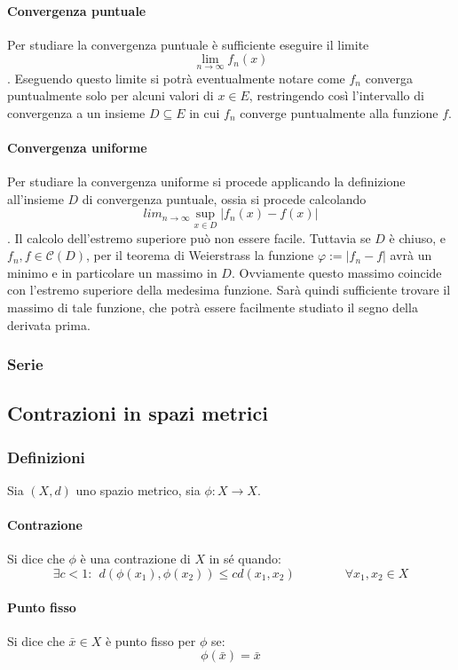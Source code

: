 \documentclass[a4paper,12pt]{article}
\newcommand{\cont}{\mathscr{C}}
\begin{document}
\paragraph*{Convergenza puntuale}
Per studiare la convergenza puntuale è sufficiente eseguire il limite
$$\lim_{n\to\infty} f_n(x)$$.
Eseguendo questo limite si potrà eventualmente notare come ${f_n}$ converga puntualmente solo per alcuni valori di $x\in E$, restringendo così l'intervallo di convergenza a un insieme $D\subseteq E$ in cui $f_n$ converge puntualmente alla funzione $f$.
\paragraph{Convergenza uniforme}
Per studiare la convergenza uniforme si procede applicando la definizione all'insieme $D$ di convergenza puntuale, ossia si procede calcolando
$$lim_{n\to\infty} \sup_{x\in D} |f_n(x)- f(x)|$$.
Il calcolo dell'estremo superiore può non essere facile. Tuttavia se $D$ è chiuso, e $f_n, f \in\cont(D)$,   per il teorema di Weierstrass la funzione $\varphi:=|f_n-f|$ avrà un minimo e in particolare un massimo in $D$. Ovviamente questo massimo coincide con l'estremo superiore della medesima funzione. Sarà quindi sufficiente trovare il massimo di tale funzione, che potrà essere facilmente studiato il segno della derivata prima.

\subsubsection{Serie}


\subsection{Contrazioni in spazi metrici}
\subsubsection{Definizioni}
Sia $(X, d)$ uno spazio metrico, sia $\phi : X\rightarrow X$.
\paragraph{Contrazione}
Si dice che $\phi$ è una contrazione di $X$ in sé quando:
$$\exists c < 1:\ \ d(\phi(x_1), \phi(x_2)) \leq cd(x_1, x_2)\qquad\qquad\forall x_1, x_2 \in X$$
\paragraph{Punto fisso}
Si dice che $\bar{x}\in X$ è punto fisso per $\phi$ se:
$$\phi(\bar{x})=\bar{x}$$
\end{document}
